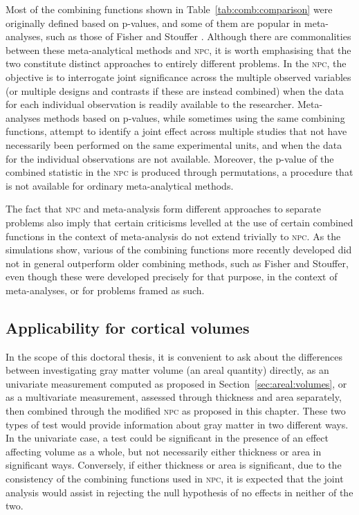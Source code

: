 Most of the combining functions shown in Table~\ref{tab:comb:comparison} were originally defined based on p-values, and some of them are popular in meta-analyses, such as those of Fisher and Stouffer \citep{Borenstein2009}. Although there are commonalities between these meta-analytical methods and \textsc{npc}, it is worth emphasising that the two constitute distinct approaches to entirely different problems. In the \textsc{npc}, the objective is to interrogate joint significance across the multiple observed variables (or multiple designs and contrasts if these are instead combined) when the data for each individual observation is readily available to the researcher. Meta-analyses methods based on p-values, while sometimes using the same combining functions, attempt to identify a joint effect across multiple studies that not have necessarily been performed on the same experimental units, and when the data for the individual observations are not available. Moreover, the p-value of the combined statistic in the \textsc{npc} is produced through permutations, a procedure that is not available for ordinary meta-analytical methods. 

The fact that \textsc{npc} and meta-analysis form different approaches to separate problems also imply that certain criticisms levelled at the use of certain combined functions in the context of meta-analysis do not extend trivially to \textsc{npc}. As the simulations show, various of the combining functions more recently developed did not in general outperform older combining methods, such as Fisher and Stouffer, even though these were developed precisely for that purpose, in the context of meta-analyses, or for problems framed as such.

\subsection{Applicability for cortical volumes}

In the scope of this doctoral thesis, it is convenient to ask about the differences between investigating gray matter volume (an areal quantity) directly, as an univariate measurement computed as proposed in Section~\ref{sec:areal:volumes}, or as a multivariate measurement, assessed through thickness and area separately, then combined through the modified \textsc{npc} as proposed in this chapter. These two types of test would provide information about gray matter in two different ways. In the univariate case, a test could be significant in the presence of an effect affecting volume as a whole, but not necessarily either thickness or area in significant ways. Conversely, if either thickness or area is significant, due to the consistency of the combining functions used in \textsc{npc}, it is expected that the joint analysis would assist in rejecting the null hypothesis of no effects in neither of the two.

